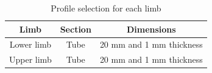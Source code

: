 \begin{table}[ht!]
\centering
\caption{Profile selection for each limb}
\label{tab:profile_selection}
\begin{tabular}{c|c|c}
  \textbf{Limb} & \textbf{Section} & \textbf{Dimensions} \\ \hline
  Lower limb & Tube & 20 mm and 1 mm thickness \\ \hline
  Upper limb & Tube & 20 mm and 1 mm thickness 
\end{tabular}
\end{table}




